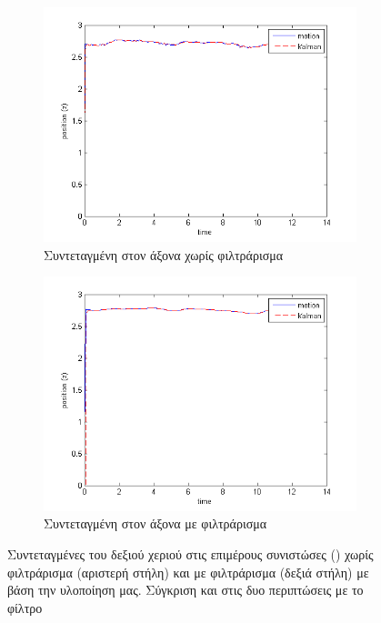 \begin{figure}[H]
    \centering
    \begin{subfigure}[t]{.48\textwidth}
        \includegraphics[width=\textwidth, keepaspectratio]{fig/filter0-z.png}
        \caption{Συντεταγμένη στον  άξονα χωρίς φιλτράρισμα}
        \label{fig:filter0-z}
    \end{subfigure}
    \begin{subfigure}[t]{.48\textwidth}
        \includegraphics[width=\textwidth, keepaspectratio]{fig/filter3-z.png}
        \caption{Συντεταγμένη στον  άξονα με φιλτράρισμα}
        \label{fig:filter3-z}
    \end{subfigure}
    \caption{Συντεταγμένες του δεξιού χεριού στις επιμέρους συνιστώσες () χωρίς φιλτράρισμα (αριστερή στήλη) και με φιλτράρισμα (δεξιά στήλη) με βάση την υλοποίηση μας. Σύγκριση και στις δυο περιπτώσεις με το φίλτρο }
    \label{fig:no-filter-filter-kalman}
\end{figure}

